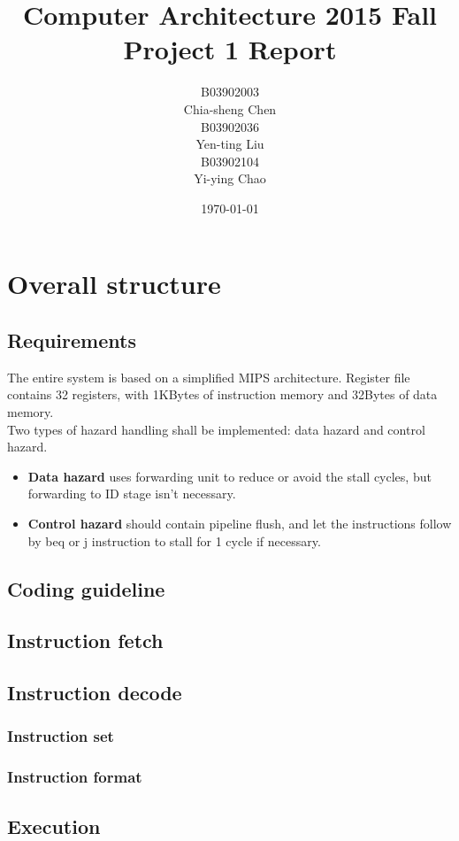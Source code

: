 \documentclass[11pt, a4paper, twoside]{IEEEtran}
\title
{
	Computer Architecture 2015 Fall\\
	Project 1 Report
}
\author
{
	\begin{multicols}{3}
		B03902003\\Chia-sheng Chen\\
		B03902036\\Yen-ting Liu\\
		B03902104\\Yi-ying Chao
	\end{multicols}
}
\date{\today}
\begin{document}
\maketitle

\section{Overall structure}

\subsection{Requirements}
The entire system is based on a simplified MIPS architecture. Register file contains 32 registers, with 1KBytes of instruction memory and 32Bytes of data memory.\\

Two types of hazard handling shall be implemented: data hazard and control hazard.
\begin{itemize}
\item \textbf{Data hazard} uses {\sc forwarding unit} to reduce or avoid the stall cycles, but forwarding to {\sc ID} stage isn't necessary. 
\item \textbf{Control hazard} should contain pipeline flush, and let the instructions follow by beq or j instruction to stall for 1 cycle if necessary.
\end{itemize}

\subsection{Coding guideline}
\subsection{Instruction fetch}
\subsection{Instruction decode}
\subsubsection{Instruction set}
\subsubsection{Instruction format}
\subsection{Execution}
\end{document}
